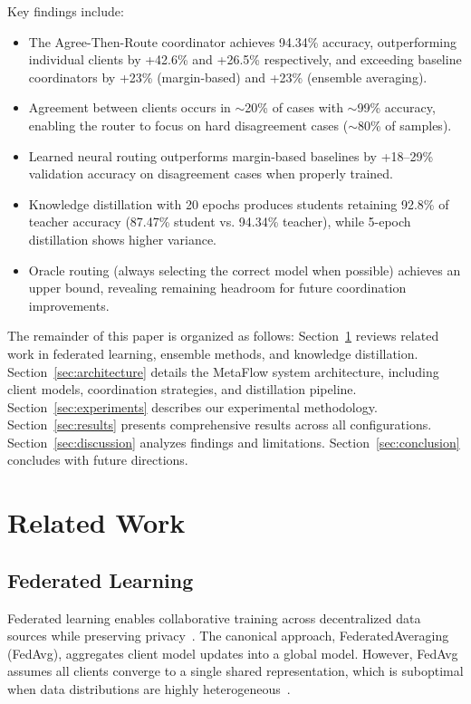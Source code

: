 \documentclass[12pt]{article}
\begin{document}
Key findings include:
\begin{itemize}
    \item The Agree-Then-Route coordinator achieves 94.34\% accuracy, outperforming individual clients by +42.6\% and +26.5\% respectively, and exceeding baseline coordinators by +23\% (margin-based) and +23\% (ensemble averaging).
    \item Agreement between clients occurs in $\sim$20\% of cases with $\sim$99\% accuracy, enabling the router to focus on hard disagreement cases ($\sim$80\% of samples).
    \item Learned neural routing outperforms margin-based baselines by +18--29\% validation accuracy on disagreement cases when properly trained.
    \item Knowledge distillation with 20 epochs produces students retaining 92.8\% of teacher accuracy (87.47\% student vs. 94.34\% teacher), while 5-epoch distillation shows higher variance.
    \item Oracle routing (always selecting the correct model when possible) achieves an upper bound, revealing remaining headroom for future coordination improvements.
\end{itemize}

The remainder of this paper is organized as follows: Section~\ref{sec:related} reviews related work in federated learning, ensemble methods, and knowledge distillation. Section~\ref{sec:architecture} details the MetaFlow system architecture, including client models, coordination strategies, and distillation pipeline. Section~\ref{sec:experiments} describes our experimental methodology. Section~\ref{sec:results} presents comprehensive results across all configurations. Section~\ref{sec:discussion} analyzes findings and limitations. Section~\ref{sec:conclusion} concludes with future directions.

\section{Related Work}
\label{sec:related}

\subsection{Federated Learning}

Federated learning enables collaborative training across decentralized data sources while preserving privacy~\cite{mcmahan2017communication, kairouz2019advances}. The canonical approach, FederatedAveraging (FedAvg), aggregates client model updates into a global model. However, FedAvg assumes all clients converge to a single shared representation, which is suboptimal when data distributions are highly heterogeneous~\cite{li2020federated, karimireddy2020scaffold}.
\end{document}
